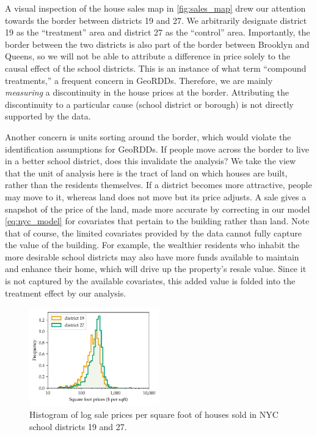 A visual inspection of the house sales map in \autoref{fig:sales_map} drew our attention towards the border between districts 19 and 27.
We arbitrarily designate district 19 as the ``treatment'' area and district 27 as the ``control'' area.
Importantly, the border between the two districts is also part of the border between Brooklyn and Queens, so we will not be able to attribute a difference in price solely to the causal effect of the school districts.
This is an instance of what \cite{keele_titiunik_2015} term ``compound treatments,'' a frequent concern in GeoRDDs.
Therefore, we are mainly \emph{measuring} a discontinuity in the house prices at the border.
Attributing the discontinuity to a particular cause (school district or borough) is not directly supported by the data.

Another concern is units sorting around the border, which would violate the identification assumptions for GeoRDDs.
If people move across the border to live in a better school district, does this invalidate the analysis?
We take the view that the unit of analysis here is the tract of land on which houses are built, rather than the residents themselves.
If a district becomes more attractive, people may move to it, whereas land does not move but its price adjusts.
A sale gives a snapshot of the price of the land, made more accurate by correcting in our model \autoref{eq:nyc_model} for covariates that pertain to the building rather than land.
Note that of course, the limited covariates provided by the data cannot fully capture the value of the building.
For example, the wealthier residents who inhabit the more desirable school districts may also have more funds available to maintain and enhance their home, which will drive up the property's resale value.
Since it is not captured by the available covariates, this added value is folded into the treatment effect by our analysis.

\begin{figure}[tb]
    \centering
    \includegraphics[width=0.5\textwidth]{figures/sales_histogram_19-27.pdf}
    \caption{\label{fig:NYC_histogram}Histogram of log sale prices per square foot of houses sold in NYC school districts 19 and 27.}
\end{figure}

